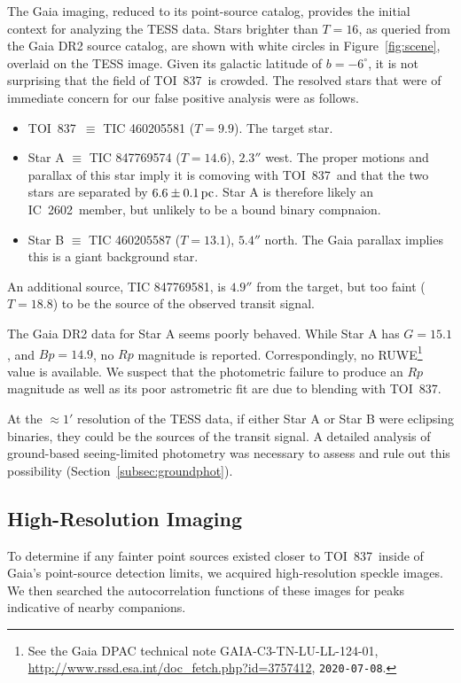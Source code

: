 \documentclass[12pt,twocolumn,tighten]{aastex63}
\newcommand{\tn}{TOI~837} %
\newcommand{\cn}{IC~2602} %
\begin{document}
The Gaia imaging, reduced to its point-source catalog, provides the
initial context for analyzing the TESS data.  Stars brighter than
$T=16$, as queried from the Gaia DR2 source catalog, are shown with
white circles in Figure~\ref{fig:scene}, overlaid on the TESS image.
Given its galactic latitude of $b=-6^\circ$, it is not surprising that
the field of \tn\ is crowded.  The resolved stars that were of
immediate concern for our false positive analysis were as follows.
\begin{itemize}
  \item \tn\ $\equiv$ TIC 460205581 ($T=9.9$). The target star.
  \item Star A $\equiv$ TIC 847769574 ($T=14.6$), $2.3''$ west. The
    proper motions and parallax of this star imply it is comoving with
    \tn\ and that the two stars are separated by $6.6\pm 0.1\,{\rm pc}$.
    Star A is therefore likely an \cn\ member, but unlikely to be a bound
    binary compnaion.
  \item Star B $\equiv$ TIC 460205587 ($T=13.1$), $5.4''$ north.  The
    Gaia parallax implies this is a giant background star.
\end{itemize}
An additional source, TIC 847769581, is $4.9''$ from the target, but
too faint ($T=18.8$) to be the source of the observed transit signal.

The Gaia DR2 data for Star A seems poorly behaved.  While Star A has
$G=15.1$, and $Bp=14.9$, no $Rp$ magnitude is reported.
Correspondingly, no RUWE\footnote{ See the Gaia DPAC technical note
GAIA-C3-TN-LU-LL-124-01,
\url{http://www.rssd.esa.int/doc_fetch.php?id=3757412},
\texttt{2020-07-08}. } value is available.  We suspect that the
photometric failure to produce an $Rp$ magnitude as well as its poor
astrometric fit are due to blending with \tn.

At the $\approx1'$ resolution of the TESS data, if either Star A or
Star B were eclipsing binaries, they could be the sources of the
transit signal.  A detailed analysis of ground-based seeing-limited
photometry was necessary to assess and rule out this possibility
(Section~\ref{subsec:groundphot}).


\subsection{High-Resolution Imaging}
\label{subsec:speckle}

To determine if any fainter point sources existed closer to \tn\
inside of Gaia's point-source detection limits, we acquired
high-resolution speckle images. We then searched the autocorrelation
functions of these images for peaks indicative of nearby companions.
\end{document}
